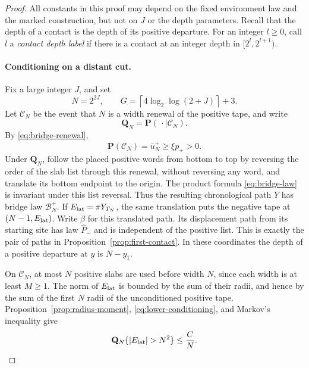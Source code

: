 \begin{proof}
All constants in this proof may depend on the fixed environment law and the
marked construction, but not on $J$ or the depth parameters.  Recall that the
depth of a contact is the depth of its positive departure.  For an integer
$l\ge0$, call $l$ a \emph{contact depth label} if there is a contact at an integer
depth in $[2^l,2^{l+1})$.

\paragraph{Conditioning on a distant cut.}
Fix a large integer $J$, and set
\begin{equation}\label{eq:lower-scales}
 N=2^{2J},\qquad
 G=\left\lceil 4\log_2\log(2+J)\right\rceil+3.
\end{equation}
Let $\mathcal C_N$ be the event that $N$ is a width renewal of the positive
tape, and write
\[
 \mathbf Q_N=\mathbf P(\,\cdot\mid\mathcal C_N).
\]
By \eqref{eq:bridge-renewal},
\begin{equation}\label{eq:lower-conditioning}
 \mathbf P(\mathcal C_N)=\bar u_N^+\ge\xi p_+>0.
\end{equation}
Under $\mathbf Q_N$, follow the placed positive words from bottom to top by
reversing the order of the slab list through this renewal, without reversing
any word, and translate its bottom endpoint to the origin.  The product formula
\eqref{eq:bridge-law} is invariant under this list
reversal.  Thus the resulting chronological path $Y$ has bridge law
$\mathcal B_N^+$.  If $E_{\rm lat}=\pi Y_{T_N}$, the same translation puts the
negative tape at $(N-1,E_{\rm lat})$.  Write $\beta$ for this translated path.
Its displacement path from its starting site has law $\widehat P_-$ and is
independent of the positive list.  This is
exactly the pair of paths in Proposition~\ref{prop:first-contact}.  In these
coordinates the depth of a positive departure at $y$ is $N-y_1$.

On $\mathcal C_N$, at most $N$ positive slabs are used before width $N$, since
each width is at least $M\ge1$.  The norm of $E_{\rm lat}$ is bounded by the sum
of their radii, and hence by the sum of the first $N$ radii of the unconditioned
positive tape.  Proposition~\ref{prop:radius-moment},
\eqref{eq:lower-conditioning}, and Markov's inequality give
\begin{equation}\label{eq:lower-endpoint-tail}
 \mathbf Q_N\{\lvert E_{\rm lat}\rvert>N^2\}\le \frac{C}{N}.
\end{equation}


\end{proof}
